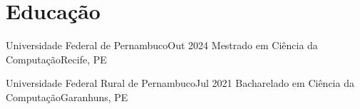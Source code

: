 \section{Educação}
    \resumeSubHeadingListStart
    \resumeSubheading
    {Universidade Federal de Pernambuco}{Out 2024}
    {Mestrado em Ciência da Computação}{Recife, PE}

    \resumeSubheading
    {Universidade Federal Rural de Pernambuco}{Jul 2021}
    {Bacharelado em Ciência da Computação}{Garanhuns, PE}
    \resumeItemListStart
    \resumeItemListEnd

    \resumeSubHeadingListEnd

